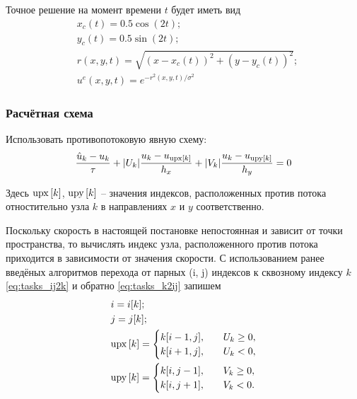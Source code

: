 Точное решение на момент времени $t$ будет иметь вид
\begin{align*}
    & x_c(t) =  0.5\cos(2 t); \\
    & y_c(t) =  0.5\sin(2 t); \\
    & r(x, y, t) = \sqrt{(x - x_c(t))^2 + (y - y_c(t))^2};  \\
    & u^e(x, y, t) = e^{-r^2(x, y, t)/\sigma^2}
\end{align*}


\subsubsection{Расчётная схема}

Использовать противопотоковую явную схему:
\begin{equation*}
    \frac{\hat u_k - u_k}{\tau}
        + |U_k| \frac{u_k - u_{{\mathrm{upx}\left[k\right]}}}{h_x}
        + |V_k| \frac{u_k - u_{{\mathrm{upy}\left[k\right]}}}{h_y} = 0
\end{equation*}

Здесь ${\mathrm{upx}\left[k\right]}$, ${\mathrm{upy}\left[k\right]}$ -- 
значения индексов, расположенных против потока
отностительно узла $k$ в направлениях $x$ и $y$ соответственно.

Поскольку скорость в настоящей постановке непостоянная и зависит от точки пространства,
то вычислять индекс узла, расположенного против потока
приходится в зависимости от значения скорости.
С использованием ранее введёных алгоритмов перехода
от парных (i, j) индексов к сквозному индексу $k$ \eqref{eq:tasks_ij2k} и обратно \eqref{eq:tasks_k2ij} запишем
\begin{align*}
    & i = i[k]; \\
    & j = j[k]; \\
    & {\mathrm{upx}\left[k\right]} = \begin{cases}
          k[i-1, j], & \quad U_k \geq 0, \\
          k[i+1, j], & \quad U_k < 0 ,\\
      \end{cases} \\
    & {\mathrm{upy}\left[k\right]} = \begin{cases}
          k[i, j-1], & \quad V_k \geq 0, \\
          k[i, j+1], & \quad V_k < 0.\\
      \end{cases}
\end{align*}

